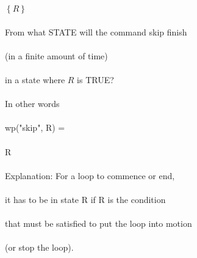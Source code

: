 \documentclass{article}
\begin{document}
$\left\{R\right\}$
\\
\\
From what STATE will the command skip finish
\\
\\
(in a finite amount of time) 
\\
\\
in a state where $R$ is TRUE?
\\
\\
In other words
\\
\\
wp("skip", R) = 
\\
\\
R
\\
\\
Explanation: 
For a loop to commence or end,
\\
\\
it has to be in state R if R is the condition 
\\
\\
that must be satisfied to put the loop into motion
\\
\\
(or stop the loop).
\end{document}
